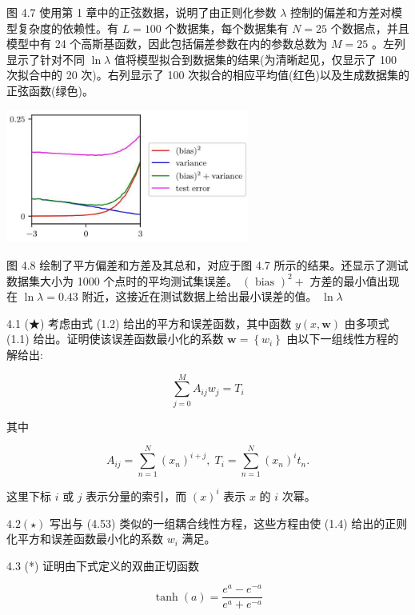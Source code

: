 \documentclass[10pt]{article}
\begin{document}
图 4.7 使用第 1 章中的正弦数据，说明了由正则化参数 \(\lambda\) 控制的偏差和方差对模型复杂度的依赖性。有 \(L = {100}\) 个数据集，每个数据集有 \(N = {25}\) 个数据点，并且模型中有 24 个高斯基函数，因此包括偏差参数在内的参数总数为 \(M = {25}\) 。左列显示了针对不同 \(\ln \lambda\) 值将模型拟合到数据集的结果(为清晰起见，仅显示了 100 次拟合中的 20 次)。右列显示了 100 次拟合的相应平均值(红色)以及生成数据集的正弦函数(绿色)。

\begin{center}
\includegraphics[max width=0.6\textwidth]{images/0194e279-9b28-703a-88f4-c3ac21e2010d_147_767_344_784_430_0.jpg}
\end{center}
\hspace*{3em} 

图 4.8 绘制了平方偏差和方差及其总和，对应于图 4.7 所示的结果。还显示了测试数据集大小为 1000 个点时的平均测试集误差。 \({\left( \text{ bias }\right) }^{2} +\) 方差的最小值出现在 \(\ln \lambda  = {0.43}\) 附近，这接近在测试数据上给出最小误差的值。 \(\ln \lambda\)

4.1 (★) 考虑由式 (1.2) 给出的平方和误差函数，其中函数 \(y\left( {x,\mathbf{w}}\right)\) 由多项式 (1.1) 给出。证明使该误差函数最小化的系数 \(\mathbf{w} = \left\{  {w}_{i}\right\}\) 由以下一组线性方程的解给出:

\[
\mathop{\sum }\limits_{{j = 0}}^{M}{A}_{ij}{w}_{j} = {T}_{i} \tag{4.53}
\]

其中

\[
{A}_{ij} = \mathop{\sum }\limits_{{n = 1}}^{N}{\left( {x}_{n}\right) }^{i + j},\;{T}_{i} = \mathop{\sum }\limits_{{n = 1}}^{N}{\left( {x}_{n}\right) }^{i}{t}_{n}. \tag{4.54}
\]

这里下标 \(i\) 或 \(j\) 表示分量的索引，而 \({\left( x\right) }^{i}\) 表示 \(x\) 的 \(i\) 次幂。

\({4.2}\left( \star \right)\) 写出与 (4.53) 类似的一组耦合线性方程，这些方程由使 (1.4) 给出的正则化平方和误差函数最小化的系数 \({w}_{i}\) 满足。

4.3 (*) 证明由下式定义的双曲正切函数

\[
\tanh \left( a\right)  = \frac{{e}^{a} - {e}^{-a}}{{e}^{a} + {e}^{-a}} \tag{4.55}
\]
\end{document}
